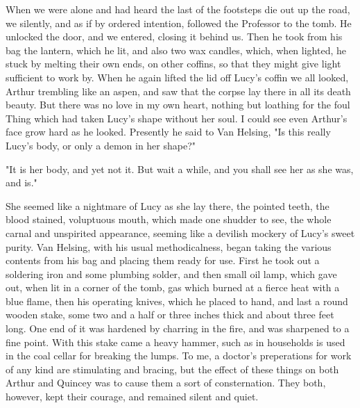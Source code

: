 When we were alone and had heard the last of the footsteps die out up the road, we silently, and as if by ordered intention, followed the Professor to the tomb. He unlocked the door, and we entered, closing it behind us. Then he took from his bag the lantern, which he lit, and also two wax candles, which, when lighted, he stuck by melting their own ends, on other coffins, so that they might give light sufficient to work by. When he again lifted the lid off Lucy's coffin we all looked, Arthur trembling like an aspen, and saw that the corpse lay there in all its death beauty. But there was no love in my own heart, nothing but loathing for the foul Thing which had taken Lucy's shape without her soul. I could see even Arthur's face grow hard as he looked. Presently he said to Van Helsing, "Is this really Lucy's body, or only a demon in her shape?" 

"It is her body, and yet not it. But wait a while, and you shall see her as she was, and is." 

She seemed like a nightmare of Lucy as she lay there, the pointed teeth, the blood stained, voluptuous mouth, which made one shudder to see, the whole carnal and unspirited appearance, seeming like a devilish mockery of Lucy's sweet purity. Van Helsing, with his usual methodicalness, began taking the various contents from his bag and placing them ready for use. First he took out a soldering iron and some plumbing solder, and then small oil lamp, which gave out, when lit in a corner of the tomb, gas which burned at a fierce heat with a blue flame, then his operating knives, which he placed to hand, and last a round wooden stake, some two and a half or three inches thick and about three feet long. One end of it was hardened by charring in the fire, and was sharpened to a fine point. With this stake came a heavy hammer, such as in households is used in the coal cellar for breaking the lumps. To me, a doctor's preperations for work of any kind are stimulating and bracing, but the effect of these things on both Arthur and Quincey was to cause them a sort of consternation. They both, however, kept their courage, and remained silent and quiet. 

